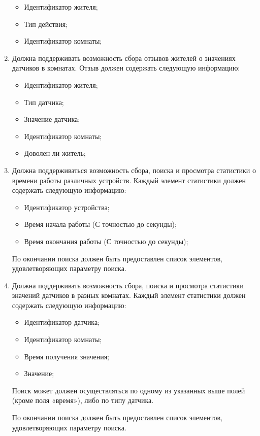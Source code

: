 \begin{enumerate}
            \begin{itemize}
              \item Идентификатор жителя;
	            \item Тип действия;
	            \item Идентификатор комнаты; 
            \end{itemize}
        \item Должна поддерживать возможность сбора отзывов жителей о значениях датчиков в комнатах. Отзыв должен содержать следующую  информацию: 
            \begin{itemize}
              \item Идентификатор жителя;
	            \item Тип датчика;
	            \item Значение датчика;
	            \item Идентификатор комнаты;
	            \item Доволен ли житель;
            \end{itemize}
        \item Должна поддерживаться возможность сбора, поиска и просмотра статистики о времени работы различных устройств. Каждый элемент статистики должен содержать следующую информацию:
          \begin{itemize}
            \item Идентификатор устройства;
            \item Время начала работы (С точностью до секунды);
            \item Время окончания работы (С точностью до секунды);
          \end{itemize}          
          По окончании поиска должен быть предоставлен список элементов, удовлетворяющих параметру поиска.
        \item Должна поддерживать возможность сбора, поиска и просмотра статистики значений датчиков в разных комнатах. Каждый элемент статистики должен содержать следующую информацию:
          \begin{itemize}
            \item Идентификатор датчика;
	          \item Идентификатор комнаты;
	          \item Время получения значения;
	          \item Значение;
          \end{itemize}
          
          Поиск может должен осуществляться по одному из указанных выше полей (кроме поля «время»), либо по типу датчика.
          
          По окончании поиска должен быть предоставлен список элементов, удовлетворяющих параметру поиска. 
      \end{enumerate}
